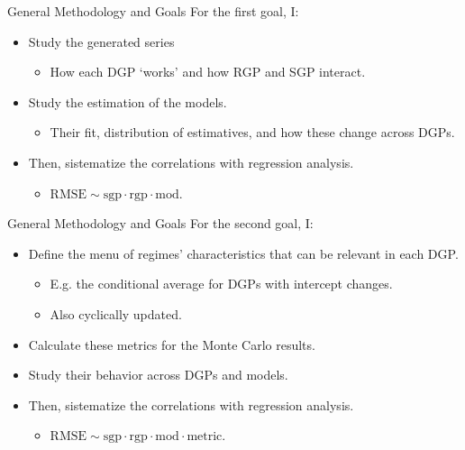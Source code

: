 \documentclass[
  ignorenonframetext,
]{beamer}
\providecommand{\tightlist}{%
  \setlength{\itemsep}{0pt}\setlength{\parskip}{0pt}}\usepackage{longtable,booktabs,array}
\newcommand{\sgp}{\text{sgp}}
\newcommand{\rgp}{\text{rgp}}
\renewcommand{\mod}{\text{mod}}
\begin{document}
\begin{frame}{General Methodology and Goals}
\label{general-methodology-and-goals-2}
For the first goal, I:

\begin{itemize}
\tightlist
\item
  Study the generated series

  \begin{itemize}
  \tightlist
  \item
    How each DGP `works' and how RGP and SGP interact.
  \end{itemize}
\item
  Study the estimation of the models.

  \begin{itemize}
  \tightlist
  \item
    Their fit, distribution of estimatives, and how these change across
    DGPs.
  \end{itemize}
\item
  Then, sistematize the correlations with regression analysis.

  \begin{itemize}
  \tightlist
  \item
    \(\text{RMSE} \sim \sgp \cdot \rgp \cdot \mod\).
  \end{itemize}
\end{itemize}
\end{frame}

\begin{frame}{General Methodology and Goals}
\label{general-methodology-and-goals-3}
For the second goal, I:

\begin{itemize}
\tightlist
\item
  Define the menu of regimes' characteristics that can be relevant in
  each DGP.

  \begin{itemize}
  \tightlist
  \item
    E.g. the conditional average for DGPs with intercept changes.
  \item
    Also cyclically updated.
  \end{itemize}
\item
  Calculate these metrics for the Monte Carlo results.
\item
  Study their behavior across DGPs and models.
\item
  Then, sistematize the correlations with regression analysis.

  \begin{itemize}
  \tightlist
  \item
    \(\text{RMSE} \sim \sgp \cdot \rgp \cdot \mod \cdot \text{metric}\).
  \end{itemize}
\end{itemize}
\end{frame}
\end{document}

